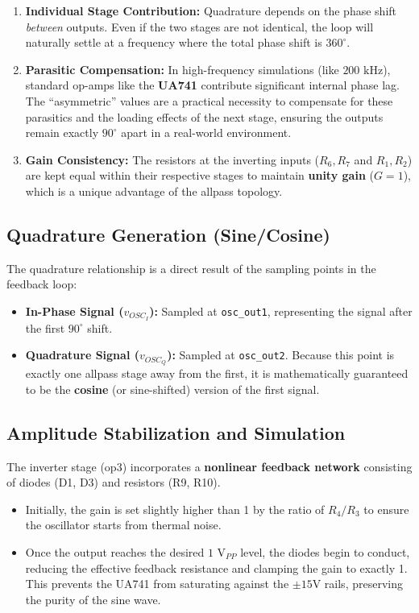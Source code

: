 \documentclass[conference]{IEEEtran}
\begin{document}
\begin{enumerate}
    \item \textbf{Individual Stage Contribution:} Quadrature depends on the phase shift \textit{between} outputs. Even if the two stages are not identical, the loop will naturally settle at a frequency where the total phase shift is $360^{\circ}$.
    \item \textbf{Parasitic Compensation:} In high-frequency simulations (like $200\text{ kHz}$), standard op-amps like the \textbf{UA741} contribute significant internal phase lag. The ``asymmetric'' values are a practical necessity to compensate for these parasitics and the loading effects of the next stage, ensuring the outputs remain exactly $90^{\circ}$ apart in a real-world environment.
    \item \textbf{Gain Consistency:} The resistors at the inverting inputs ($R_6, R_7$ and $R_1, R_2$) are kept equal within their respective stages to maintain \textbf{unity gain} ($G=1$), which is a unique advantage of the allpass topology.
\end{enumerate}

\subsection{Quadrature Generation (Sine/Cosine)}
The quadrature relationship is a direct result of the sampling points in the feedback loop:
\begin{itemize}
    \item \textbf{In-Phase Signal ($v_{OSC_I}$):} Sampled at \texttt{osc\_out1}, representing the signal after the first $90^{\circ}$ shift.
    \item \textbf{Quadrature Signal ($v_{OSC_Q}$):} Sampled at \texttt{osc\_out2}. Because this point is exactly one allpass stage away from the first, it is mathematically guaranteed to be the \textbf{cosine} (or sine-shifted) version of the first signal.
\end{itemize}

\subsection{Amplitude Stabilization and Simulation}
The inverter stage (op3) incorporates a \textbf{nonlinear feedback network} consisting of diodes (D1, D3) and resistors (R9, R10). 
\begin{itemize}
    \item Initially, the gain is set slightly higher than 1 by the ratio of $R_4/R_3$ to ensure the oscillator starts from thermal noise.
    \item Once the output reaches the desired \textbf{$1\text{ V}_{PP}$} level, the diodes begin to conduct, reducing the effective feedback resistance and clamping the gain to exactly 1. This prevents the UA741 from saturating against the $\pm15\text{V}$ rails, preserving the purity of the sine wave.
\end{itemize}
\end{document}
